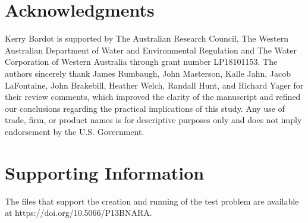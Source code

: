 \documentclass{article}
\begin{document}
\section*{Acknowledgments}
Kerry Bardot is supported by The Australian Research Council, The Western Australian Department of Water and Environmental Regulation and The Water Corporation of Western Australia through grant number LP18101153. The authors sincerely thank James Rumbaugh, John Masterson, Kalle Jahn, Jacob LaFontaine, John Brakebill, Heather Welch, Randall Hunt, and Richard Yager for their review comments, which improved the clarity of the manuscript and refined our conclusions regarding the practical implications of this study. Any use of trade, firm, or product names is for descriptive purposes only and does not imply endorsement by the U.S. Government.

\section*{Supporting Information}
The files that support the creation and running of the test problem are available at https://doi.org/10.5066/P13BNARA.


\end{document}
